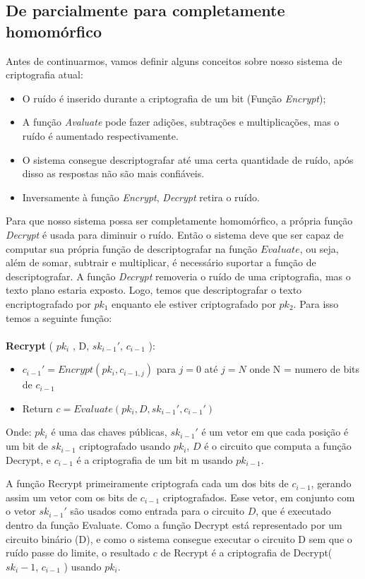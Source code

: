 	\subsection{De parcialmente para completamente homomórfico}
	Antes de continuarmos, vamos definir alguns conceitos sobre nosso sistema de criptografia atual:
	\begin{itemize}
		\item O ruído é inserido durante a criptografia de um bit (Função \textit{Encrypt});
		\item A função \textit{Avaluate} pode fazer adições, subtrações e multiplicações, mas o ruído é aumentado respectivamente.
		\item O sistema consegue descriptografar até uma certa quantidade de ruído, após disso as respostas não são mais confiáveis.
		\item Inversamente à função \textit{Encrypt}, \textit{Decrypt} retira o ruído.
	\end{itemize}
  
	Para que nosso sistema possa ser completamente homomórfico, a própria função \textit{Decrypt} é usada para diminuir o ruído.
	Então o sistema deve que ser capaz de computar sua própria função de descriptografar na função \(Evaluate\), ou seja, além de somar, subtrair e multiplicar, é necessário suportar a função de descriptografar.
	A função \textit{Decrypt} removeria o ruído de uma criptografia, mas o texto plano estaria exposto. Logo, temos que descriptografar o texto encriptografado por \(pk_1\) enquanto ele estiver criptografado por \(pk_2\). Para isso temos a seguinte função:
  \\\\
	\textbf{Recrypt} ( \(pk_i\) , D, \(sk_{i-1}'\), \(c_{i-1}\) ):
	\begin{itemize}
		\item \( c_{i-1}' = Encrypt(pk_i, c_{i-1,j}) \) para \( j = 0 \) até \( j = N \) onde N = numero de bits de \( c_{i-1} \)
		\item Return \( c = Evaluate(pk_i, D, sk_{i-1}', c_{i-1}') \)
	\end{itemize}
	Onde: \( pk_i \) é uma das chaves públicas, \( sk_{i-1}' \) é um vetor em que cada posição é um bit de \( sk_{i-1} \) criptografado usando \( pk_i \), \( D \) é o circuito que computa a função Decrypt, e \( c_{i-1} \) é a criptografia de um bit m usando \( pk_{i-1} \).
  
	A função Recrypt primeiramente criptografa cada um dos bits de \( c_{i-1} \), gerando assim um vetor com os bits de \( c_{i-1} \) criptografados.
	Esse vetor, em conjunto com o vetor \( sk_{i-1}' \) são usados como entrada para o circuito \( D \), que é executado dentro da função Evaluate.
	Como a função Decrypt está representado por um circuito binário (D), e como o sistema consegue executar o circuito D sem que o ruído passe do limite, o resultado \( c \) de Recrypt é a criptografia de Decrypt( \( sk_i-1 \), \( c_{i-1} \) ) usando \( pk_i \).
  
